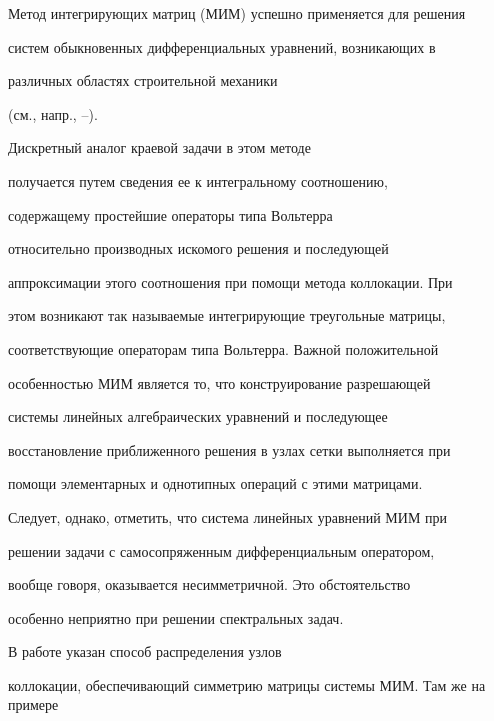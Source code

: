 \maketitle


\label{begin}








Метод интегрирующих матриц (МИМ) успешно применяется для решения


систем обыкновенных дифференциальных уравнений, возникающих в


различных областях строительной механики


(см., напр., \cite{Smirnov}--\cite{Firsov}).


Дискретный аналог краевой задачи в этом методе


получается путем сведения ее к интегральному соотношению,


содержащему простейшие операторы типа Вольтерра


относительно производных искомого решения и последующей


аппроксимации этого соотношения при помощи метода коллокации. При


этом возникают так называемые интегрирующие треугольные матрицы,


соответствующие операторам типа Вольтерра. Важной положительной


особенностью МИМ является то, что конструирование разрешающей


системы линейных алгебраических уравнений и последующее


восстановление приближенного решения в узлах сетки выполняется при


помощи элементарных и однотипных операций с этими матрицами.





Следует, однако, отметить, что система линейных уравнений МИМ при


решении задачи с самосопряженным дифференциальным оператором,


вообще говоря, оказывается несимметричной. Это обстоятельство


особенно неприятно при решении спектральных задач.





В работе \cite{DautPaim} указан способ распределения узлов


коллокации, обеспечивающий симметрию матрицы системы МИМ. Там же на примере


